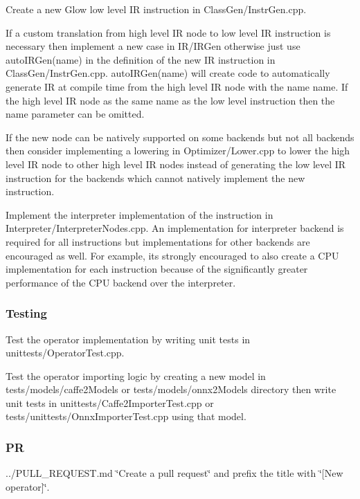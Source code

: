 \begin{DoxyItemize}
\item Create a new Glow low level IR instruction in {\ttfamily Class\+Gen/\+Instr\+Gen.\+cpp}.
\item If a custom translation from high level IR node to low level IR instruction is necessary then implement a new case in {\ttfamily I\+R/\+I\+R\+Gen} otherwise just use {\ttfamily auto\+I\+R\+Gen(name)} in the definition of the new IR instruction in {\ttfamily Class\+Gen/\+Instr\+Gen.\+cpp}. {\ttfamily auto\+I\+R\+Gen(name)} will create code to automatically generate IR at compile time from the high level IR node with the name {\ttfamily name}. If the high level IR node as the same name as the low level instruction then the {\ttfamily name} parameter can be omitted.
\item If the new node can be natively supported on some backends but not all backends then consider implementing a lowering in {\ttfamily Optimizer/\+Lower.\+cpp} to lower the high level IR node to other high level IR nodes instead of generating the low level IR instruction for the backends which cannot natively implement the new instruction.
\item Implement the interpreter implementation of the instruction in {\ttfamily Interpreter/\+Interpreter\+Nodes.\+cpp}. An implementation for interpreter backend is required for all instructions but implementations for other backends are encouraged as well. For example, it\textquotesingle{}s strongly encouraged to also create a C\+PU implementation for each instruction because of the significantly greater performance of the C\+PU backend over the interpreter.
\end{DoxyItemize}

\subsubsection*{Testing}


\begin{DoxyItemize}
\item Test the operator implementation by writing unit tests in {\ttfamily unittests/\+Operator\+Test.\+cpp}.
\item Test the operator importing logic by creating a new model in {\ttfamily tests/models/caffe2\+Models} or {\ttfamily tests/models/onnx2\+Models} directory then write unit tests in {\ttfamily unittests/\+Caffe2\+Importer\+Test.\+cpp} or {\ttfamily tests/unittests/\+Onnx\+Importer\+Test.\+cpp} using that model.
\end{DoxyItemize}

\subsubsection*{PR}


\begin{DoxyItemize}
\item ../\+P\+U\+L\+L\+\_\+\+R\+E\+Q\+U\+E\+ST.md \char`\"{}\+Create a pull request\char`\"{} and prefix the title with \char`\"{}\mbox{[}\+New operator\mbox{]}\char`\"{}. 
\end{DoxyItemize}